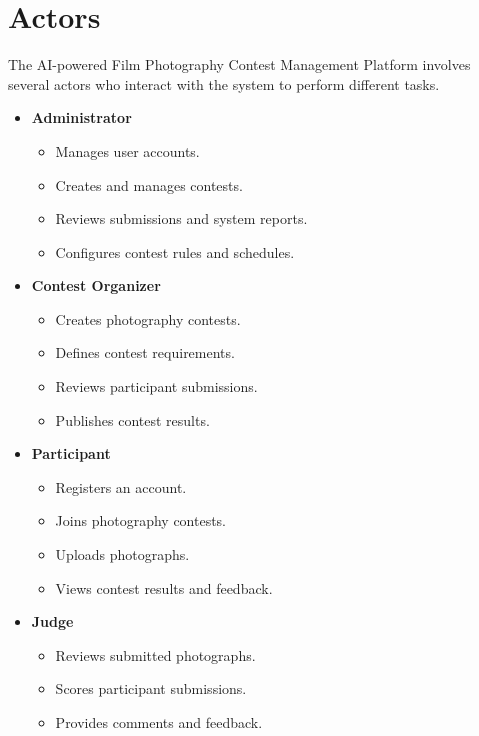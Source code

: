 \section{Actors}
The AI-powered Film Photography Contest Management Platform involves several actors who interact with the system to perform different tasks.
\begin{itemize}
    \item \textbf{Administrator}
    \begin{itemize}
        \item Manages user accounts.
        \item Creates and manages contests.
        \item Reviews submissions and system reports.
        \item Configures contest rules and schedules.
    \end{itemize}
    \item \textbf{Contest Organizer}
    \begin{itemize}
        \item Creates photography contests.
        \item Defines contest requirements.
        \item Reviews participant submissions.
        \item Publishes contest results.
    \end{itemize}
    \item \textbf{Participant}
    \begin{itemize}
        \item Registers an account.
        \item Joins photography contests.
        \item Uploads photographs.
        \item Views contest results and feedback.
    \end{itemize}
    \item \textbf{Judge}
    \begin{itemize}
        \item Reviews submitted photographs.
        \item Scores participant submissions.
        \item Provides comments and feedback.
    \end{itemize}
\end{itemize}
